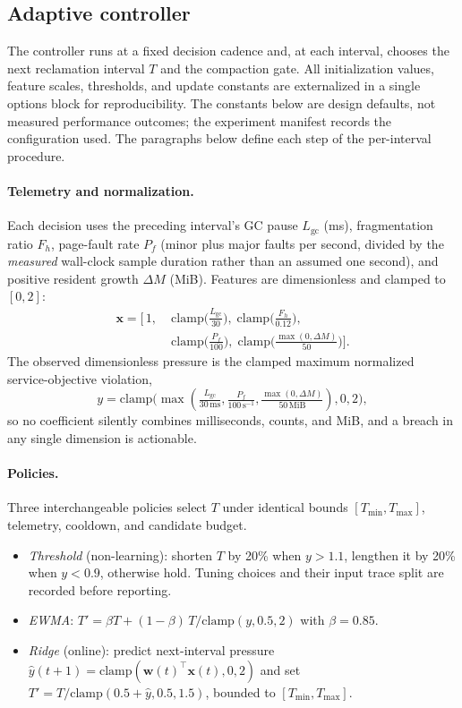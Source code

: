 \subsection{Adaptive controller}
\label{sec:controller}

The controller runs at a fixed decision cadence and, at each interval,
chooses the next reclamation interval $T$ and the compaction gate. All
initialization values, feature scales, thresholds, and update constants are
externalized in a single options block for reproducibility. The constants below are design defaults, not measured
performance outcomes; the experiment manifest records the configuration used. The
paragraphs below define each step of the per-interval procedure.

\paragraph{Telemetry and normalization.}
Each decision uses the preceding interval's GC pause
$L_{\mathrm{gc}}$ (ms), fragmentation ratio $F_h$, page-fault rate $P_f$
(minor plus major faults per second, divided by the \emph{measured}
wall-clock sample duration rather than an assumed one second), and positive
resident growth $\Delta M$ (MiB). Features are dimensionless and clamped to
$[0,2]$:
\begin{equation}
\begin{aligned}
\mathbf{x} = \bigl[\,1,\;
  &\mathrm{clamp}\!\bigl(\tfrac{L_{\mathrm{gc}}}{30}\bigr),\;
  \mathrm{clamp}\!\bigl(\tfrac{F_h}{0.12}\bigr),\\
  &\mathrm{clamp}\!\bigl(\tfrac{P_f}{100}\bigr),\;
  \mathrm{clamp}\!\bigl(\tfrac{\max(0,\Delta M)}{50}\bigr)\bigr].
\end{aligned}
\end{equation}
The observed dimensionless pressure is the clamped maximum normalized
service-objective violation,
\[
y=\mathrm{clamp}\bigl(\max(\tfrac{L_{\mathrm{gc}}}{30\,\text{ms}},
  \tfrac{P_f}{100\,\text{s}^{-1}},\tfrac{\max(0,\Delta M)}{50\,\text{MiB}}),0,2\bigr),
\]
so no coefficient silently combines milliseconds, counts, and MiB, and a breach in
any single dimension is actionable.

\paragraph{Policies.}
Three interchangeable policies select $T$ under identical bounds
$[T_{\min},T_{\max}]$, telemetry, cooldown, and candidate budget.
\begin{itemize}
  \item \emph{Threshold} (non-learning): shorten $T$ by 20\% when
  $y>1.1$, lengthen it by 20\% when $y<0.9$, otherwise hold. Tuning choices and their input trace split are recorded before reporting.
  \item \emph{EWMA}: $T' = \beta T + (1-\beta)\,T/\mathrm{clamp}(y,0.5,2)$
  with $\beta = 0.85$.
  \item \emph{Ridge} (online): predict next-interval pressure
  $\hat{y}(t{+}1) = \mathrm{clamp}(\mathbf{w}(t)^{\!\top}\mathbf{x}(t),0,2)$
  and set $T' = T/\mathrm{clamp}(0.5+\hat{y},0.5,1.5)$, bounded to
  $[T_{\min},T_{\max}]$.
\end{itemize}

